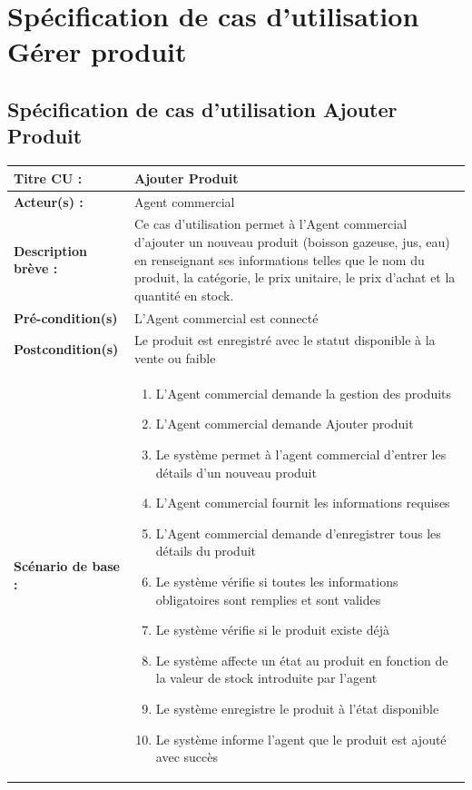\section{Spécification de cas d'utilisation Gérer produit}

\subsection{Spécification de cas d'utilisation Ajouter Produit}

\begingroup
\small
\renewcommand{\arraystretch}{0.92}
\begin{longtable}{|p{3.4cm}|p{11.2cm}|}
\hline
\textbf{Titre CU :} & Ajouter Produit \\
\hline
\textbf{Acteur(s) :} & Agent commercial \\
\hline
\textbf{Description brève :} & Ce cas d'utilisation permet à l'Agent commercial d'ajouter un nouveau produit (boisson gazeuse, jus, eau) en renseignant ses informations telles que le nom du produit, la catégorie, le prix unitaire, le prix d'achat et la quantité en stock. \\
\hline
\textbf{Pré-condition(s)} & L'Agent commercial est connecté \\
\hline
\textbf{Postcondition(s)} & Le produit est enregistré avec le statut disponible à la vente ou faible \\
\hline
\textbf{Scénario de base :} &
\begin{enumerate}[leftmargin=1.5em, topsep=2pt, itemsep=1pt]
  \item L'Agent commercial demande la gestion des produits
  \item L'Agent commercial demande Ajouter produit
  \item Le système permet à l'agent commercial d'entrer les détails d'un nouveau produit
  \item L'Agent commercial fournit les informations requises
  \item L'Agent commercial demande d'enregistrer tous les détails du produit
  \item Le système vérifie si toutes les informations obligatoires sont remplies et sont valides
  \item Le système vérifie si le produit existe déjà
  \item Le système affecte un état au produit en fonction de la valeur de stock introduite par l’agent
  \item Le système enregistre le produit à l'état disponible
  \item Le système informe l'agent que le produit est ajouté avec succès

\end{enumerate}
\end{longtable}
